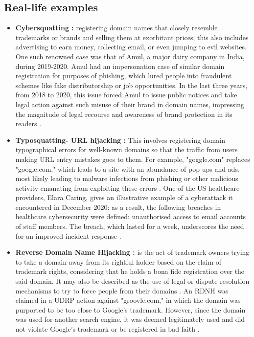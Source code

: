 \subsection{Real-life examples}

\begin{itemize}
    \item \textbf{Cybersquatting :} registering domain names that closely resemble trademarks or brands and selling them at exorbitant prices; this also includes advertising to earn money, collecting email, or even jumping to evil websites. One such renowned case was that of Amul, a major dairy company in India, during 2019-2020. Amul had an impersonation case of similar domain registration for purposes of phishing, which lured people into fraudulent schemes like fake distributorship or job opportunities. In the last three years, from 2018 to 2020, this issue forced Amul to issue public notices and take legal action against such misuse of their brand in domain names, impressing the magnitude of legal recourse and awareness of brand protection in its readers \cite{MehtaCybersquatting}.
    
    \item \textbf{Typosquatting- URL hijacking :} This involves registering domain typographical errors for well-known domains so that the traffic from users making URL entry mistakes goes to them. For example, "goggle.com" replaces "google.com," which leads to a site with an abundance of pop-ups and ads, most likely leading to malware infections from phishing or other malicious activity emanating from exploiting these errors \cite{SplunkTyposquatting}. One of the US healthcare providers, Elara Caring, gives an illustrative example of a cyberattack it encountered in December 2020: as a result, the following breaches in healthcare cybersecurity were defined: unauthorised access to email accounts of staff members. The breach, which lasted for a week, underscores the need for an improved incident response \cite{PandaSecurityPhishing}.
    
     \item \textbf{Reverse Domain Name Hijacking  :} is the act of trademark owners trying to take a domain away from its rightful holder based on the claim of trademark rights, considering that he holds a bona fide registration over the said domain. It may also be described as the use of legal or dispute resolution mechanisms to try to force people from their domains \cite{Sun2006DomainTrademarkConflict}.  An RDNH was claimed in a UDRP action against "groovle.com," in which the domain was purported to be too close to Google's trademark. However, since the domain was used for another search engine, it was deemed legitimately used and did not violate Google's trademark or be registered in bad faith \cite{Singh2011ReverseDomainHijacking}.
\end{itemize}


